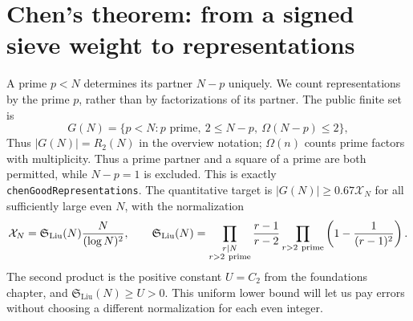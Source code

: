 \section{Chen's theorem: from a signed sieve weight to representations}
\label{bp:chen-route}

A prime $p<N$ determines its partner $N-p$ uniquely.  We count representations
by the prime $p$, rather than by factorizations of its partner.  The public finite set is
\[
 G(N)=\{p<N:p\text{ prime},\ 2\le N-p,\ \Omega(N-p)\le2\},
\]
Thus $|G(N)|=R_2(N)$ in the overview notation; $\Omega(n)$ counts prime factors with multiplicity.
Thus a prime partner and a square of a prime are both permitted, while
$N-p=1$ is excluded.  This is exactly \texttt{chenGoodRepresentations}.
The quantitative target is $|G(N)|\ge0.67 \mathcal X_N$ for all sufficiently large
even $N$, with the normalization
\[
 \mathcal X_N=\mathfrak S_{\mathrm{Liu}}(N)\frac{N}{(\log N)^2},\qquad
 \mathfrak S_{\mathrm{Liu}}(N)=\prod_{\substack{r\mid N\\r>2\ \text{prime}}}\frac{r-1}{r-2}
                 \prod_{r>2\ {\rm prime}}\left(1-\frac1{(r-1)^2}\right).
\]
The second product is the positive constant $U=C_2$ from the foundations chapter, and $\mathfrak S_{\mathrm{Liu}}(N)\ge U>0$.  This uniform lower bound will let us pay errors
without choosing a different normalization for each even integer.


